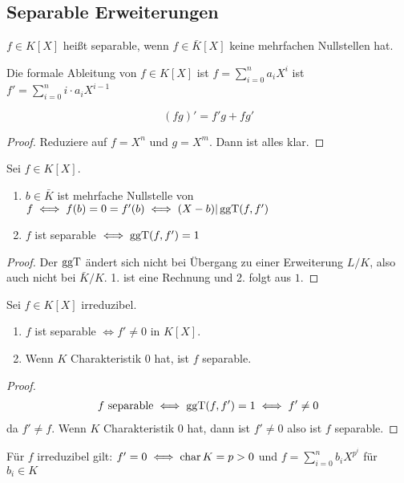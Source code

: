 \subsection{Separable Erweiterungen}
\begin{Def}
    $f\in K[X]$ heißt separable, wenn $f\in \bar K[X]$ keine mehrfachen Nullstellen hat.
\end{Def}
\begin{Def}
    Die formale Ableitung von $f\in K[X]$ ist $ f=\sum_{i=0}^na_iX^i$ ist $f'=\sum_{i=0}^ni\cdot a_iX^{i-1}$
\end{Def}
\begin{Lemma}
    $$(fg)'=f'g+fg'$$
\end{Lemma}
\begin{proof}
    Reduziere auf $f=X^n$ und $g=X^m$. Dann ist alles klar.
\end{proof}
\begin{Lemma}
    Sei $f\in K[X]$.
    \begin{enumerate}
        \item $b\in \bar K$ ist mehrfache Nullstelle von $f\iff f(b)=0=f'(b)\iff (X-b)| \operatorname{ggT}(f,f')$
        \item $f$ ist separable $\iff \operatorname{ggT}(f,f')=1$
    \end{enumerate}
\end{Lemma}
\begin{proof}
    Der $\operatorname{ggT}$ ändert sich nicht bei Übergang zu einer Erweiterung $L/K$, also auch nicht bei $\bar K/K$. 1. ist eine Rechnung und 2. folgt aus $1$.
\end{proof}
\begin{Satz}
    Sei $f\in K[X]$ irreduzibel.
    \begin{enumerate}
        \item $f$ ist separable $\iff f'\neq 0$ in $K[X]$.
        \item Wenn $K$ Charakteristik $0$ hat, ist $f$ separable.
    \end{enumerate}
\end{Satz}
\begin{proof}
    \begin{align*}
        f \text{ separable}\iff\operatorname{ggT}(f,f')=1\iff f'\neq 0
    \end{align*} da $f'\neq f$.
    Wenn $K$ Charakteristik 0 hat, dann ist $f'\neq 0$ also ist $f$ separable.
\end{proof}
\begin{Bem} Für $f$ irreduzibel gilt:
    $f'=0\iff \operatorname{char} K=p>0$ und $f=\sum_{i=0}^nb_iX^{p^i}$ für $b_i\in K$
\end{Bem}
